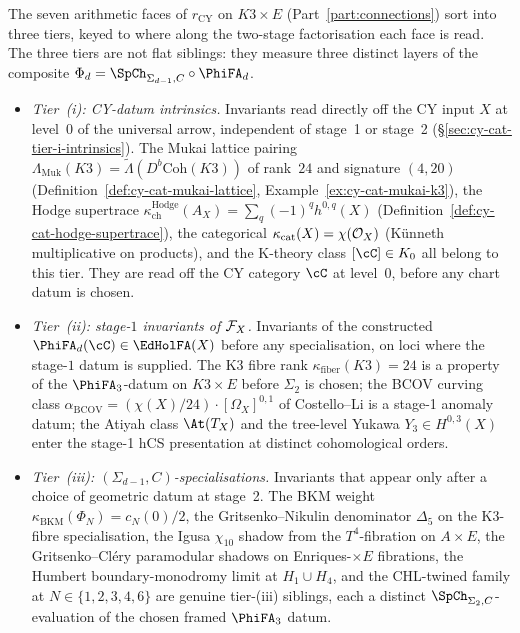 The seven arithmetic faces of $r_{\mathrm{CY}}$ on $K3\times E$
(Part~\ref{part:connections}) sort into three tiers, keyed to
where along the two-stage factorisation each face is read. The
three tiers are not flat siblings: they measure three distinct
layers of the composite
$\Phi_d = \SpCh_{\Sigma_{d-1}, C}\circ\PhiFA_d$.

\begin{itemize}[leftmargin=1.5em,topsep=0.3ex,itemsep=0.5ex]
\item \emph{Tier~\textup{(i)}: CY-datum intrinsics.}
 Invariants read directly off the CY input $X$ at level~$0$
 of the universal arrow, independent of stage~1 or stage~2
 (\S\ref{sec:cy-cat-tier-i-intrinsics}). The Mukai lattice
 pairing $\Lambda_{\mathrm{Muk}}(K3) = \widetilde\Lambda(D^b\mathrm{Coh}(K3))$
 of rank~$24$ and signature $(4, 20)$
 (Definition~\ref{def:cy-cat-mukai-lattice},
 Example~\ref{ex:cy-cat-mukai-k3}), the Hodge supertrace
 $\kappa_{\mathrm{ch}}^{\mathrm{Hodge}}(A_X) =
 \sum_q (-1)^q h^{0, q}(X)$
 (Definition~\ref{def:cy-cat-hodge-supertrace}), the categorical
 $\kappa_{\mathrm{cat}}(X) = \chi(\mathcal{O}_X)$ (K\"unneth
 multiplicative on products), and the K-theory class
 $[\cC] \in K_0$ all belong to this tier. They are read off the
 CY category $\cC$ at level~$0$, before any chart datum is chosen.
\item \emph{Tier~\textup{(ii)}: stage-$1$ invariants of $\mathcal{F}_X$.}
 Invariants of the constructed $\PhiFA_d(\cC) \in \EdHolFA(X)$
 before any specialisation, on loci where the stage-$1$ datum is
 supplied. The K3 fibre rank
 $\kappa_{\mathrm{fiber}}(K3) = 24$ is a property of the
 $\PhiFA_3$-datum on $K3\times E$ before $\Sigma_2$ is chosen;
 the BCOV curving class
 $\alpha_{\mathrm{BCOV}} = (\chi(X)/24)\cdot[\Omega_X]^{0, 1}$
 of Costello--Li is a stage-1 anomaly datum; the Atiyah class
 $\At(T_X)$ and the tree-level Yukawa
 $Y_3 \in H^{0, 3}(X)$ enter the stage-1 hCS presentation at
 distinct cohomological orders.
\item \emph{Tier~\textup{(iii)}: $(\Sigma_{d-1}, C)$-specialisations.}
 Invariants that appear only after a choice of geometric
 datum at stage~2. The BKM weight
 $\kappa_{\mathrm{BKM}}(\Phi_N) = c_N(0)/2$, the
 Gritsenko--Nikulin denominator $\Delta_5$ on the K3-fibre
 specialisation, the Igusa $\chi_{10}$ shadow from the
 $T^4$-fibration on $A\times E$, the Gritsenko--Cl\'ery
 paramodular shadows on Enriques-$\times E$ fibrations, the
 Humbert boundary-monodromy limit at $H_1\cup H_4$, and the
 CHL-twined family at $N \in \{1, 2, 3, 4, 6\}$ are genuine
 tier-(iii) siblings, each a distinct
	 $\SpCh_{\Sigma_2, C}$-evaluation of the chosen framed
	 $\PhiFA_3$ datum.
\end{itemize}

